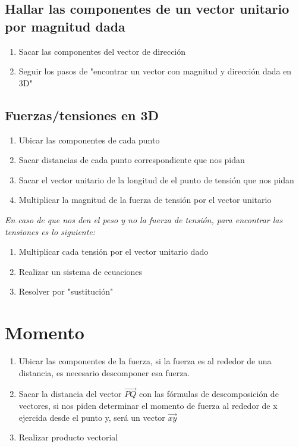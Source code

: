 \documentclass[letterpaper,12pt]{article}
\begin{document}
\begin{sloppypar}
\subsection*{Hallar las componentes de un vector unitario por magnitud dada}
\begin{enumerate}
    \item Sacar las componentes del vector de dirección
    \item Seguir los pasos de "encontrar un vector con magnitud y dirección dada en 3D"
\end{enumerate}
\subsection*{Fuerzas/tensiones en 3D}
\begin{enumerate}
    \item Ubicar las componentes de cada punto
    \item Sacar distancias de cada punto correspondiente que nos pidan 
    \item Sacar el vector unitario de la longitud de el punto de tensión que nos pidan 
    \item Multiplicar la magnitud de la fuerza de tensión por el vector unitario 
\end{enumerate}
\textit{En caso de que nos den el peso y no la fuerza de tensión, para encontrar las tensiones es lo siguiente:}
\begin{enumerate}
    \item Multiplicar cada tensión por el vector unitario dado 
    \item Realizar un sistema de ecuaciones
    \item Resolver por "sustitución"
\end{enumerate}
\section*{Momento}
\begin{enumerate}
    \item Ubicar las componentes de la fuerza, si la fuerza es al rededor de una distancia, es necesario descomponer esa fuerza.
    \item Sacar la distancia del vector $\vec{PQ}$ con las fórmulas de descomposición de vectores, si nos piden determinar el momento de fuerza al rededor de x ejercida desde el punto y, será un vector $\vec{xy}$ 
    \item Realizar producto vectorial
\end{enumerate}












\end{sloppypar}
\end{document}
